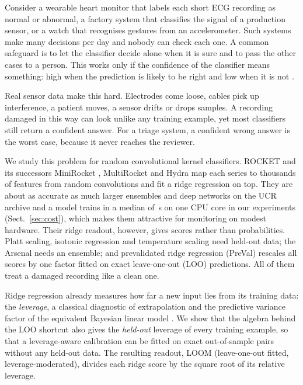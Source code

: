 \documentclass[preprint,12pt,authoryear]{elsarticle}
\begin{document}
Consider a wearable heart monitor that labels each short ECG recording as normal or abnormal, a factory system that classifies the signal of a production sensor, or a watch that recognises gestures from an accelerometer. Such systems make many decisions per day and nobody can check each one. A common safeguard is to let the classifier decide alone when it is sure and to pass the other cases to a person. This works only if the confidence of the classifier means something: high when the prediction is likely to be right and low when it is not \citep{abdar2021,gawlikowski2023}.

Real sensor data make this hard. Electrodes come loose, cables pick up interference, a patient moves, a sensor drifts or drops samples. A recording damaged in this way can look unlike any training example, yet most classifiers still return a confident answer. For a triage system, a confident wrong answer is the worst case, because it never reaches the reviewer.

We study this problem for random convolutional kernel classifiers. ROCKET \citep{dempster2020rocket} and its successors MiniRocket \citep{dempster2021minirocket}, MultiRocket \citep{tan2022multirocket} and Hydra \citep{dempster2023hydra} map each series to thousands of features from random convolutions and fit a ridge regression on top. They are about as accurate as much larger ensembles and deep networks on the UCR archive \citep{dau2019ucr,ismailfawaz2019review,middlehurst2024bakeoff} and a model trains in a median of \FitEndToEndLoom\,s on one CPU core in our experiments (Sect.~\ref{sec:cost}), which makes them attractive for monitoring on modest hardware. Their ridge readout, however, gives scores rather than probabilities. Platt scaling, isotonic regression and temperature scaling \citep{guo2017,platt1999,zadrozny2002} need held-out data; the Arsenal \citep{middlehurst2021hc2} needs an ensemble; and prevalidated ridge regression (PreVal) \citep{dempster2025preval} rescales all scores by one factor fitted on exact leave-one-out (LOO) predictions. All of them treat a damaged recording like a clean one.

Ridge regression already measures how far a new input lies from its training data: the \emph{leverage}, a classical diagnostic of extrapolation \citep{hoaglin1978} and the predictive variance factor of the equivalent Bayesian linear model \citep{mackay1992}. We show that the algebra behind the LOO shortcut also gives the \emph{held-out} leverage of every training example, so that a leverage-aware calibration can be fitted on exact out-of-sample pairs without any held-out data. The resulting readout, LOOM (leave-one-out fitted, leverage-moderated), divides each ridge score by the square root of its relative leverage.
\end{document}

